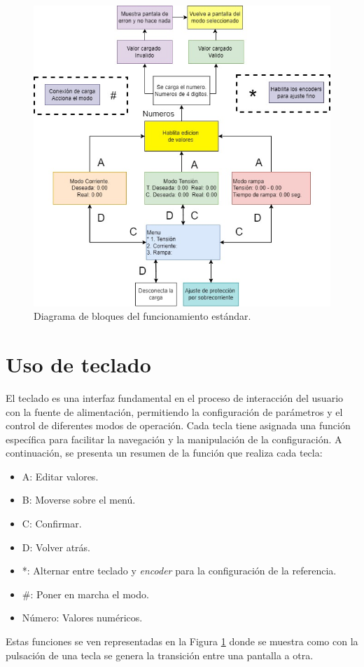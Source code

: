 \begin{figure}[H]
    \centering
    \includegraphics[scale=0.6]{./imagenes/MoverseSobreMenu.jpg}
    \caption{Diagrama de bloques del funcionamiento estándar.}
    \label{F:funcionamiento_normal}
\end{figure}

\section{Uso de teclado} 
El teclado es una interfaz fundamental en el proceso de interacción del usuario con la fuente de alimentación, permitiendo la configuración de parámetros y el control de diferentes modos de operación. Cada tecla tiene asignada una función específica para facilitar la navegación y la manipulación de la configuración. A continuación, se presenta un resumen de la función que realiza cada tecla:
\begin{itemize}
    \item A: Editar valores.
    \item B: Moverse sobre el menú.
    \item C: Confirmar.
    \item D: Volver atrás.
    \item *: Alternar entre teclado y \textit{encoder} para la configuración de la referencia.
    \item \#: Poner en marcha el modo.
    \item Número: Valores numéricos.
\end{itemize}
Estas funciones se ven representadas en la Figura \ref{F:funcionamiento_normal} donde se muestra como con la pulsación de una tecla se genera la transición entre una pantalla a otra.


